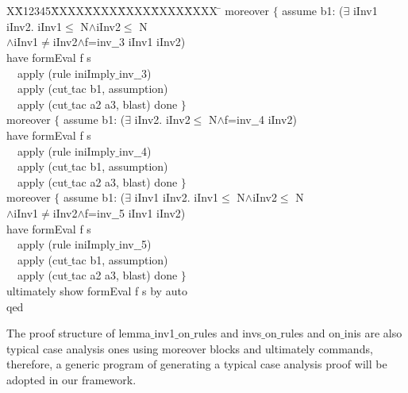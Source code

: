 \documentclass[final]{IEEEtran}
\newlength{\fminilength}
\newenvironment{fmini}[1][\linewidth]
  {\setlength{\fminilength}{#1\fboxsep-2\fboxrule}%
   \vspace{2ex}\noindent\begin{lrbox}{\fminibox}\begin{minipage}{\fminilength}%
   \mbox{ }\hfill\vspace{-2.5ex}}%
  {\end{minipage}\end{lrbox}\vspace{1ex}\hspace{0ex}%
   \framebox{\usebox{\fminibox}}}
\newenvironment{specification}
{\noindent\scriptsize
\tt\begin{fmini}\begin{tabbing}X\=X12345\=XXXX\=XXXX\=XXXX\=XXXX\=XXXX
\=\+\kill} {\end{tabbing}\normalfont\end{fmini}}
\def \twoSpaces {\ \ }
\def \iInv {iInv}
\begin{document}
\begin{specification}
    moreover $\{$
      assume b1:
($\exists$ \iInv1 \iInv2. \iInv1$\le$
N$\wedge$\iInv2$\le$
N\\
$\wedge$\iInv1$\neq$\iInv2$\wedge$f=inv$\_$$\_$3  \iInv1 \iInv2)\\

      have
formEval f s\\

\twoSpaces      apply (rule iniImply$\_$inv$\_$$\_$3)\\
\twoSpaces      apply (cut$\_$tac b1, assumption)\\
\twoSpaces      apply (cut$\_$tac a2 a3, blast) done
    $\}$\\


    moreover $\{$
      assume b1:
($\exists$ \iInv2. \iInv2$\le$
N$\wedge$f=inv$\_$$\_$4  \iInv2)\\

      have
formEval f s\\

\twoSpaces      apply (rule iniImply$\_$inv$\_$$\_$4)\\
\twoSpaces      apply (cut$\_$tac b1, assumption)\\
\twoSpaces      apply (cut$\_$tac a2 a3, blast) done
    $\}$\\


    moreover $\{$
      assume b1:
($\exists$ \iInv1 \iInv2. \iInv1$\le$
N$\wedge$\iInv2$\le$
N\\
$\wedge$\iInv1$\neq$\iInv2$\wedge$f=inv$\_$$\_$5  \iInv1 \iInv2)\\

      have
formEval f s\\

\twoSpaces      apply (rule iniImply$\_$inv$\_$$\_$5)\\
\twoSpaces      apply (cut$\_$tac b1, assumption)\\
\twoSpaces      apply (cut$\_$tac a2 a3, blast) done
    $\}$\\


  ultimately show formEval f s
  by auto\\
qed\\


\end{specification}

The proof structure of {\sf lemma$\_$inv1$\_$on$\_$rules} and  {\sf invs$\_$on$\_$rules} and {\sf on$\_$inis} are also typical case analysis ones using {\sf moreover} blocks and {\sf ultimately} commands, therefore, a generic program of generating a typical case analysis proof will be adopted in our framework.
\end{document}
